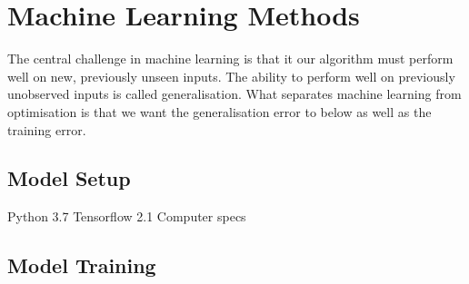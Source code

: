 \section{Machine Learning Methods}
The central challenge in machine learning is that it our algorithm must perform well on new, previously unseen inputs. The ability to perform well on previously unobserved inputs is called generalisation.
What separates machine learning from optimisation is that we want the generalisation error to below as well as the training error.\cite{Goodfellow2015}

\subsection{Model Setup}
Python 3.7
Tensorflow 2.1
Computer specs



\subsection{Model Training}

